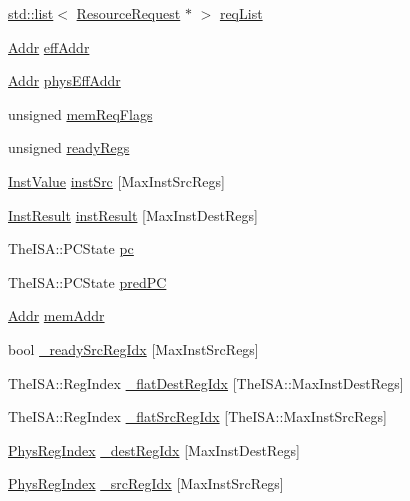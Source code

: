 \begin{DoxyCompactItemize}
\item 
\hyperlink{classstd_1_1list}{std::list}$<$ \hyperlink{classResourceRequest}{ResourceRequest} $\ast$ $>$ \hyperlink{classInOrderDynInst_a2d0462f627124fbb754758da6abbc508}{reqList}
\item 
\hyperlink{base_2types_8hh_af1bb03d6a4ee096394a6749f0a169232}{Addr} \hyperlink{classInOrderDynInst_a1097c58b547d58e4544cbf31fa68a390}{effAddr}
\item 
\hyperlink{base_2types_8hh_af1bb03d6a4ee096394a6749f0a169232}{Addr} \hyperlink{classInOrderDynInst_a159ce173047bae421effda8028f07d68}{physEffAddr}
\item 
unsigned \hyperlink{classInOrderDynInst_aba29e5174ccb47ac17cc2ff228a8e2af}{memReqFlags}
\item 
unsigned \hyperlink{classInOrderDynInst_a958ef9d1a1e41749593c5efd215fde64}{readyRegs}
\item 
\hyperlink{structInOrderDynInst_1_1InstValue}{InstValue} \hyperlink{classInOrderDynInst_aaf92019c0f8bc5367efa5d86afbcdf7d}{instSrc} \mbox{[}MaxInstSrcRegs\mbox{]}
\item 
\hyperlink{structInOrderDynInst_1_1InstResult}{InstResult} \hyperlink{classInOrderDynInst_a55a0fc52567dcc9b92b49d263cf0fb65}{instResult} \mbox{[}MaxInstDestRegs\mbox{]}
\item 
TheISA::PCState \hyperlink{classInOrderDynInst_ad3585c83b0eac985107aa5a86e43e1b4}{pc}
\item 
TheISA::PCState \hyperlink{classInOrderDynInst_aebd0b135745958ac2bdfe9deeeb60d9f}{predPC}
\item 
\hyperlink{base_2types_8hh_af1bb03d6a4ee096394a6749f0a169232}{Addr} \hyperlink{classInOrderDynInst_ae5b093c34f706d06da52bf675cde59b7}{memAddr}
\item 
bool \hyperlink{classInOrderDynInst_a125f1037e43155d592320e6c70a09b6b}{\_\-readySrcRegIdx} \mbox{[}MaxInstSrcRegs\mbox{]}
\item 
TheISA::RegIndex \hyperlink{classInOrderDynInst_a44085d1f8566ca30fef0c6787999c79b}{\_\-flatDestRegIdx} \mbox{[}TheISA::MaxInstDestRegs\mbox{]}
\item 
TheISA::RegIndex \hyperlink{classInOrderDynInst_a4b49f0a3efb36ac8c8e0de99b9ea33cc}{\_\-flatSrcRegIdx} \mbox{[}TheISA::MaxInstSrcRegs\mbox{]}
\item 
\hyperlink{classInOrderDynInst_a5ec29599c4bc29a3054c451674969e7b}{PhysRegIndex} \hyperlink{classInOrderDynInst_aab81c62ecc0c9bae628449fc2875a2e3}{\_\-destRegIdx} \mbox{[}MaxInstDestRegs\mbox{]}
\item 
\hyperlink{classInOrderDynInst_a5ec29599c4bc29a3054c451674969e7b}{PhysRegIndex} \hyperlink{classInOrderDynInst_a4b535dc40624a3cf929b90739a59119c}{\_\-srcRegIdx} \mbox{[}MaxInstSrcRegs\mbox{]}

\end{DoxyCompactItemize}
